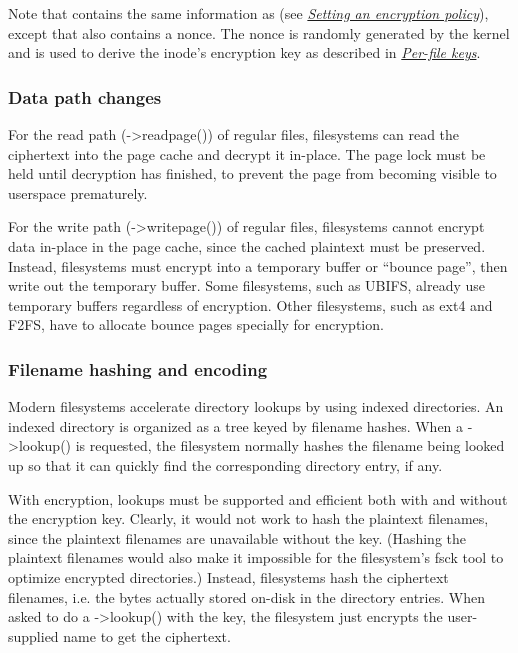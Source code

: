 \documentclass[a4paper,8pt,english]{sphinxmanual}
\begin{document}
Note that  contains the same
information as  (see {\hyperref[filesystems/fscrypt:setting\string-an\string-encryption\string-policy]{\emph{Setting an
encryption policy}}}), except that 
also contains a nonce.  The nonce is randomly generated by the kernel
and is used to derive the inode's encryption key as described in
{\hyperref[filesystems/fscrypt:per\string-file\string-keys]{\emph{Per-file keys}}}.


\subsubsection{Data path changes}
\label{filesystems/fscrypt:data-path-changes}
For the read path (-\textgreater{}readpage()) of regular files, filesystems can
read the ciphertext into the page cache and decrypt it in-place.  The
page lock must be held until decryption has finished, to prevent the
page from becoming visible to userspace prematurely.

For the write path (-\textgreater{}writepage()) of regular files, filesystems
cannot encrypt data in-place in the page cache, since the cached
plaintext must be preserved.  Instead, filesystems must encrypt into a
temporary buffer or ``bounce page'', then write out the temporary
buffer.  Some filesystems, such as UBIFS, already use temporary
buffers regardless of encryption.  Other filesystems, such as ext4 and
F2FS, have to allocate bounce pages specially for encryption.


\subsubsection{Filename hashing and encoding}
\label{filesystems/fscrypt:filename-hashing-and-encoding}
Modern filesystems accelerate directory lookups by using indexed
directories.  An indexed directory is organized as a tree keyed by
filename hashes.  When a -\textgreater{}lookup() is requested, the filesystem
normally hashes the filename being looked up so that it can quickly
find the corresponding directory entry, if any.

With encryption, lookups must be supported and efficient both with and
without the encryption key.  Clearly, it would not work to hash the
plaintext filenames, since the plaintext filenames are unavailable
without the key.  (Hashing the plaintext filenames would also make it
impossible for the filesystem's fsck tool to optimize encrypted
directories.)  Instead, filesystems hash the ciphertext filenames,
i.e. the bytes actually stored on-disk in the directory entries.  When
asked to do a -\textgreater{}lookup() with the key, the filesystem just encrypts
the user-supplied name to get the ciphertext.
\end{document}
